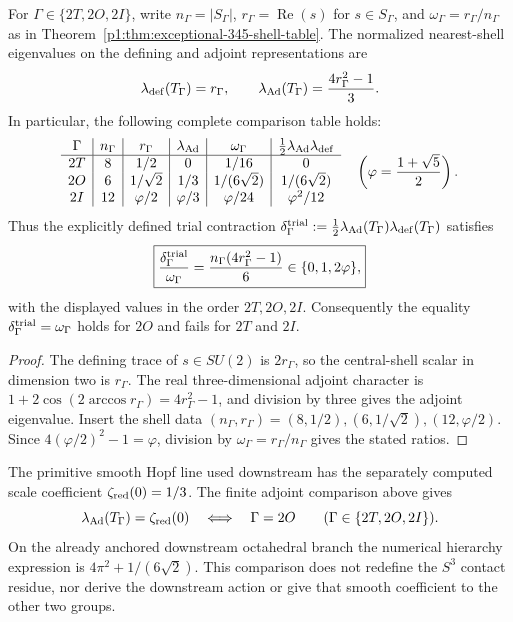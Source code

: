 \documentclass[11pt]{article}
\begin{document}
\begin{proposition}
\label{p1b:prop:v11-three-contractions}
For $\Gamma\in\{2T,2O,2I\}$, write $n_\Gamma=|S_\Gamma|$,
$r_\Gamma=\operatorname{Re}(s)$ for $s\in S_\Gamma$, and
$\omega_\Gamma=r_\Gamma/n_\Gamma$ as in
Theorem~\ref{p1:thm:exceptional-345-shell-table}.  The normalized
nearest-shell eigenvalues on the defining and adjoint representations are
\[
\lambda_{\rm def}(T_\Gamma)=r_\Gamma,\qquad
\lambda_{\rm Ad}(T_\Gamma)=\frac{4r_\Gamma^2-1}{3}.
\]
In particular, the following complete comparison table holds:
\[
\begin{array}{c|c|c|c|c|c}
\Gamma&n_\Gamma&r_\Gamma&\lambda_{\rm Ad}&
 \omega_\Gamma&\frac12\lambda_{\rm Ad}\lambda_{\rm def}\\\hline
2T&8&1/2&0&1/16&0\\
2O&6&1/\sqrt2&1/3&1/(6\sqrt2)&1/(6\sqrt2)\\
2I&12&\varphi/2&\varphi/3&\varphi/24&\varphi^2/12
\end{array}
\quad \left(\varphi=\frac{1+\sqrt5}{2}\right).
\]
Thus the explicitly defined trial contraction
$\delta^{\rm trial}_\Gamma:=\frac12\lambda_{\rm Ad}(T_\Gamma)
\lambda_{\rm def}(T_\Gamma)$ satisfies
\[
\boxed{\frac{\delta_\Gamma^{\rm trial}}{\omega_\Gamma}
 =\frac{n_\Gamma(4r_\Gamma^2-1)}6
 \in\{0,1,2\varphi\},}
\]
with the displayed values in the order $2T,2O,2I$.
Consequently the equality $\delta_\Gamma^{\rm trial}=\omega_\Gamma$
holds for $2O$ and fails for $2T$ and $2I$.
\end{proposition}
\begin{proof}
The defining trace of $s\in SU(2)$ is $2r_\Gamma$, so the
central-shell scalar in dimension two is $r_\Gamma$.  The real
three-dimensional adjoint character is
$1+2\cos(2\arccos r_\Gamma)=4r_\Gamma^2-1$, and division by three
gives the adjoint eigenvalue.  Insert the shell data
$(n_\Gamma,r_\Gamma)=(8,1/2),(6,1/\sqrt2),(12,\varphi/2)$.
Since $4(\varphi/2)^2-1=\varphi$, division by
$\omega_\Gamma=r_\Gamma/n_\Gamma$ gives the stated ratios.
\end{proof}

\begin{remark}
\leavevmode\par
The primitive smooth Hopf line used downstream has the separately
computed scale coefficient $\zeta_{\rm red}(0)=1/3$.  The finite
adjoint comparison above gives
\[
\lambda_{\rm Ad}(T_\Gamma)=\zeta_{\rm red}(0)
\quad\Longleftrightarrow\quad\Gamma=2O
\qquad(\Gamma\in\{2T,2O,2I\}).
\]
On the already anchored downstream octahedral branch the numerical
hierarchy expression is $4\pi^2+1/(6\sqrt2)$.  This comparison does
not redefine the $S^3$ contact residue, nor derive the downstream
action or give that smooth coefficient to the other two groups.
\end{remark}
\end{document}

